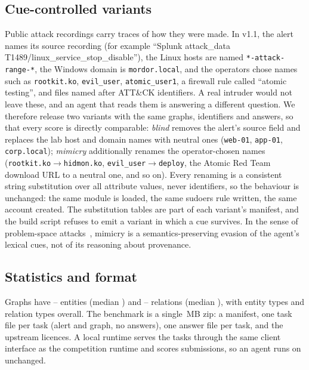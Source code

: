 \subsection{Cue-controlled variants}
\label{sec:variants}
Public attack recordings carry traces of how they were made. In \bench v1.1, the alert names its source
recording (for example ``Splunk attack\_data T1489/\allowbreak linux\_service\_stop\_disable''), the Linux hosts
are named \texttt{*-attack-range-*}, the Windows domain is \texttt{mordor.local}, and the operators chose names
such as \texttt{rootkit.ko}, \texttt{evil\_user}, \texttt{atomic\_user1}, a firewall rule called
``atomic testing'', and files named after ATT\&CK identifiers. A real intruder would not leave these, and an
agent that reads them is answering a different question. We therefore release two variants with the same
graphs, identifiers and answers, so that every score is directly comparable:
\emph{blind} removes the alert's source field and replaces the lab host and domain names with neutral ones
(\texttt{web-01}, \texttt{app-01}, \texttt{corp.local}); \emph{mimicry} additionally renames the
operator-chosen names (\texttt{rootkit.ko}$\to$\texttt{hidmon.ko}, \texttt{evil\_user}$\to$\texttt{deploy},
the Atomic Red Team download URL to a neutral one, and so on). Every renaming is a consistent string
substitution over all attribute values, never identifiers, so the behaviour is unchanged: the same module is
loaded, the same sudoers rule written, the same account created. The substitution tables are part of each
variant's manifest, and the build script refuses to emit a variant in which a cue survives. In the sense of
problem-space attacks~\cite{pierazzi2020problemspace}, mimicry is a semantics-preserving evasion of the agent's
lexical cues, not of its reasoning about provenance.

\subsection{Statistics and format}
Graphs have \BenchEntMin{}--\BenchEntMax{} entities (median \BenchEntMedian{}) and
\BenchRelMin{}--\BenchRelMax{} relations (median \BenchRelMedian{}), with \BenchEntTypes{} entity types and
\BenchRelTypes{} relation types overall. The benchmark is a single \BenchZipMB\,MB zip: a manifest, one task
file per task (alert and graph, no answers), one answer file per task, and the upstream licences. A local
runtime serves the tasks through the same client interface as the competition runtime and scores
submissions, so an agent runs on \bench unchanged.

\ifconf\else

\fi
